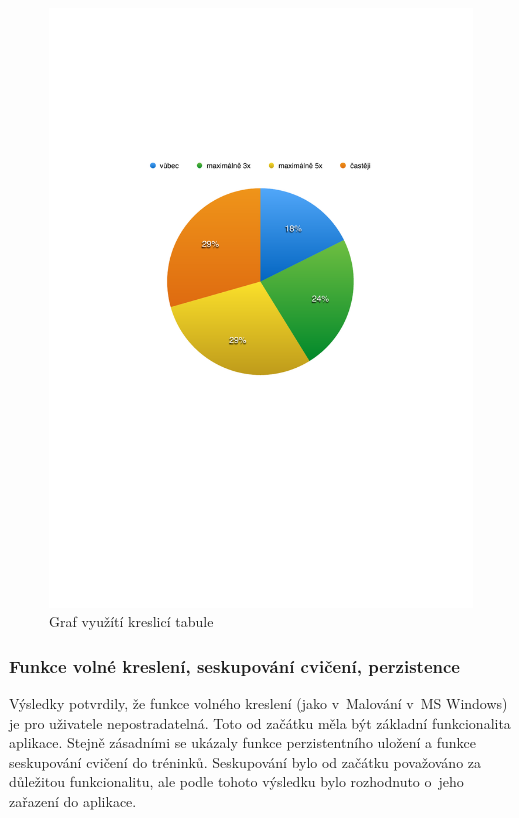 \documentclass[thesis=B,czech]{FITthesis}[2012/06/26]
\begin{document}
	\begin{figure}[h!t]
		\centering
		\includegraphics{img/graph_table_usage}
		\caption{Graf využítí kreslicí tabule}\label{graph:table_usage}
	\end{figure}

\subsubsection{Funkce volné kreslení, seskupování cvičení, perzistence}

	Výsledky potvrdily, že funkce volného kreslení (jako v~Malování v~MS Windows) je pro uživatele nepostradatelná. Toto od začátku měla být základní funkcionalita aplikace. Stejně zásadními se ukázaly funkce perzistentního uložení a funkce seskupování cvičení do tréninků. Seskupování bylo od začátku považováno za důležitou funkcionalitu, ale podle tohoto výsledku bylo rozhodnuto o~jeho zařazení do aplikace.
\end{document}
